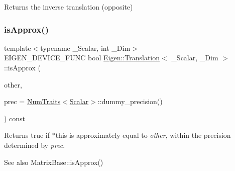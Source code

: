 \begin{DoxyReturn}{Returns}
the inverse translation (opposite) 
\end{DoxyReturn}
\mbox{\label{class_eigen_1_1_translation_a3610eaa76745dd8f2c76dd9cc949dfa5}} 
\subsubsection{\texorpdfstring{isApprox()}{isApprox()}}
{\footnotesize\ttfamily template$<$typename \+\_\+\+Scalar, int \+\_\+\+Dim$>$ \\
E\+I\+G\+E\+N\+\_\+\+D\+E\+V\+I\+C\+E\+\_\+\+F\+U\+NC bool \mbox{\hyperlink{class_eigen_1_1_translation}{Eigen\+::\+Translation}}$<$ \+\_\+\+Scalar, \+\_\+\+Dim $>$\+::is\+Approx (\begin{DoxyParamCaption}\item[{const \mbox{\hyperlink{class_eigen_1_1_translation}{Translation}}$<$ \+\_\+\+Scalar, \+\_\+\+Dim $>$ \&}]{other,  }\item[{const typename \mbox{\hyperlink{struct_eigen_1_1_num_traits}{Num\+Traits}}$<$ \mbox{\hyperlink{class_eigen_1_1_translation_ad596bf21ced4b902cc242205df486e21}{Scalar}} $>$\+::Real \&}]{prec = {\ttfamily \mbox{\hyperlink{struct_eigen_1_1_num_traits}{Num\+Traits}}$<$\mbox{\hyperlink{class_eigen_1_1_translation_ad596bf21ced4b902cc242205df486e21}{Scalar}}$>$\+:\+:dummy\+\_\+precision()} }\end{DoxyParamCaption}) const\hspace{0.3cm}{\ttfamily [inline]}}

\begin{DoxyReturn}{Returns}
{\ttfamily true} if {\ttfamily $\ast$this} is approximately equal to {\itshape other}, within the precision determined by {\itshape prec}.
\end{DoxyReturn}
\begin{DoxySeeAlso}{See also}
Matrix\+Base\+::is\+Approx() 
\end{DoxySeeAlso}
\mbox{\label{class_eigen_1_1_translation_aadd931cc42f529f502bb8c483e1995b6}} 
